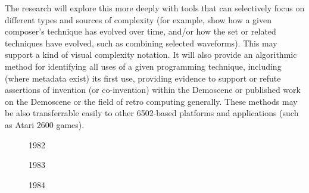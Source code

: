 \documentclass[10pt]{article}
\begin{document}
\begin{multicols*}{2}
The research will explore this more deeply with tools that can selectively focus on different types and sources of complexity (for example, show how a given composer’s technique has evolved over time, and/or how the set or related techniques have evolved, such as combining selected waveforms). This may support a kind of visual complexity notation. It will also provide an algorithmic method for identifying all uses of a given programming technique, including (where metadata exist) its first use, providing evidence to support or refute assertions of invention (or co-invention) within the Demoscene or published work on the Demoscene\cite{gatekeepers} or the field of retro computing generally. These methods may be also transferrable easily to other 6502-based platforms and applications (such as Atari 2600 games).

\begin{figure}
\noindent{}
\caption{1982}
\end{figure}

\begin{figure}
\noindent{}
\caption{1983}
\end{figure}

\begin{figure}
\noindent{}
\caption{1984}
\end{figure}


\end{multicols*}
\end{document}
